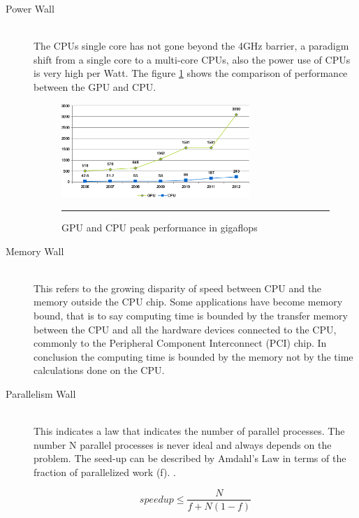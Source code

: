 \begin{description}
  \item[Power Wall] \hfill \\
  The CPUs single core has not gone beyond the 4GHz barrier, a paradigm shift from a single core to a multi-core CPUs, also  the power use of CPUs is very high per Watt. The figure \ref{fig:gpu_cpu_s} shows the comparison of performance between the GPU and CPU.

\begin{figure}[htbp]
	\centering
		\includegraphics[width=0.70\textwidth]{Figures/GPU_CPU_s.png}
		\rule{35em}{0.5pt}
	\caption[GPU and CPU]{GPU and CPU peak performance in gigaflops}
	\label{fig:gpu_cpu_s}
\end{figure}


  \item[Memory Wall] \hfill \\
  This refers to the growing disparity of speed between CPU  and the memory outside the CPU chip. Some applications have become memory bound, that is to say computing time is bounded by the transfer memory between the CPU and all the hardware devices connected to the CPU, commonly to the Peripheral Component Interconnect (PCI) chip. In conclusion the computing time is bounded by the memory not by the time calculations done on the CPU.

  \item[Parallelism Wall] \hfill \\
  This indicates a law that indicates the number of parallel processes. The number N parallel processes is never ideal and always depends on the problem.  The seed-up can be described by Amdahl's Law in terms of the fraction of parallelized work (f). \cite{quantitative}.

  $$speedup \leq \frac{N}{f + N(1-f)}$$


\end{description}

